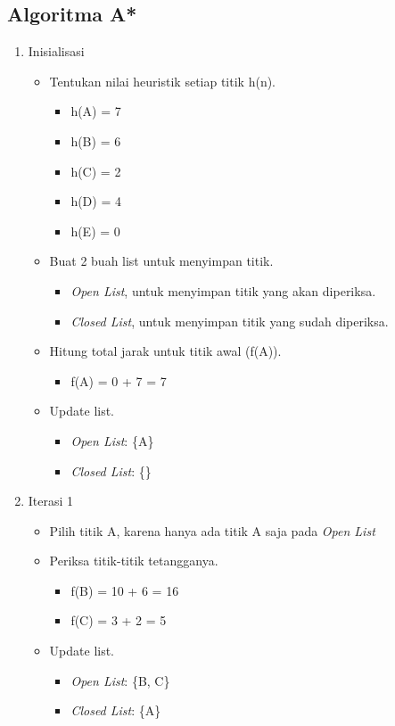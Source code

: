 \subsection{Algoritma A*}
\begin{enumerate}
    \item Inisialisasi
    \begin{itemize}
        \item Tentukan nilai heuristik setiap titik h(n).
        \begin{itemize}
            \item h(A) = 7
            \item h(B) = 6
            \item h(C) = 2
            \item h(D) = 4
            \item h(E) = 0 
        \end{itemize}
        \item Buat 2 buah list untuk menyimpan titik.
        \begin{itemize}
            \item \textit{Open List}, untuk menyimpan titik yang akan diperiksa.
            \item \textit{Closed List}, untuk menyimpan titik yang sudah diperiksa.
        \end{itemize}
        \item Hitung total jarak untuk titik awal (f(A)).
        \begin{itemize}
            \item f(A) = 0 + 7 = 7
        \end{itemize}
        \item Update list.
        \begin{itemize}
            \item \textit{Open List}: \{A\}
            \item \textit{Closed List}: \{\}
        \end{itemize}
    \end{itemize}

    \item Iterasi 1
    \begin{itemize}
        \item Pilih titik A, karena hanya ada titik A saja pada \textit{Open List}
        \item Periksa titik-titik tetangganya.
        \begin{itemize}
            \item f(B) = 10 + 6 = 16
            \item f(C) = 3 + 2 = 5
        \end{itemize}
        \item Update list.
        \begin{itemize}
            \item \textit{Open List}: \{B, C\}
            \item \textit{Closed List}: \{A\}
        \end{itemize}
    \end{itemize}


\end{enumerate}
